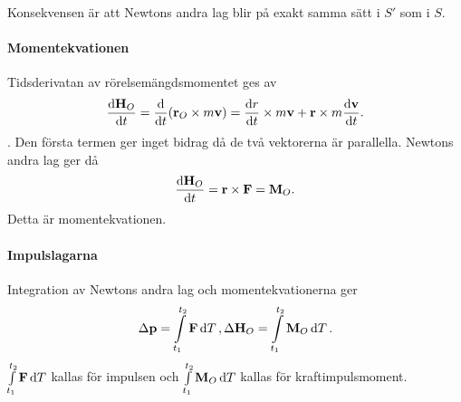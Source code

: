 Konsekvensen är att Newtons andra lag blir på exakt samma sätt i $S'$ som i $S$.

\paragraph{Momentekvationen}
Tidsderivatan av rörelsemängdsmomentet ges av
\begin{align*}
	\dv{\vb{H}_{O}}{t} = \dv{t}(\vb{r}_{O}\times m\vb{v}) = \dv{r}{t}\times m\vb{v} + \vb{r}\times m\dv{\vb{v}}{t}.
\end{align*}.
Den första termen ger inget bidrag då de två vektorerna är parallella. Newtons andra lag ger då
\begin{align*}
	\dv{\vb{H}_{O}}{t} = \vb{r}\times\vb{F} = \vb{M}_{O}.
\end{align*}
Detta är momentekvationen.

\paragraph{Impulslagarna}
Integration av Newtons andra lag och momentekvationerna ger
\begin{align*}
	\Delta\vb{p} = \int\limits_{t_1}^{t_2}\vb{F}\dd{T}, \Delta\vb{H}_{O} = \int\limits_{t_1}^{t_2}\vb{M}_{O}\dd{T}.
\end{align*}
$\int\limits_{t_1}^{t_2}\vb{F}\dd{T}$ kallas för impulsen och $\int\limits_{t_1}^{t_2}\vb{M}_{O}\dd{T}$ kallas för kraftimpulsmoment.